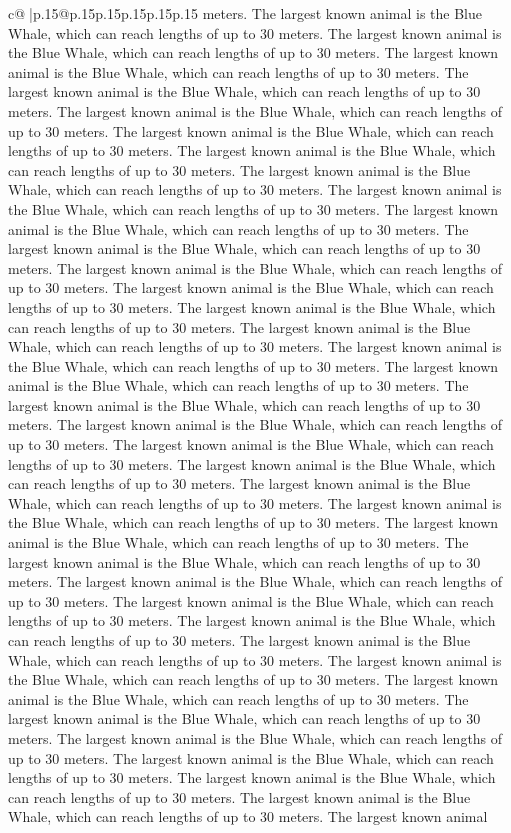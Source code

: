 \documentclass{article}
\begin{document}
{\begin{supertabular}{c@{$\;$}|p{.15\linewidth}@{}p{.15\linewidth}p{.15\linewidth}p{.15\linewidth}p{.15\linewidth}p{.15\linewidth}}
{{{meters. The largest known animal is the Blue Whale, which can reach lengths of up to 30 meters. The largest known animal is the Blue Whale, which can reach lengths of up to 30 meters. The largest known animal is the Blue Whale, which can reach lengths of up to 30 meters. The largest known animal is the Blue Whale, which can reach lengths of up to 30 meters. The largest known animal is the Blue Whale, which can reach lengths of up to 30 meters. The largest known animal is the Blue Whale, which can reach lengths of up to 30 meters. The largest known animal is the Blue Whale, which can reach lengths of up to 30 meters. The largest known animal is the Blue Whale, which can reach lengths of up to 30 meters. The largest known animal is the Blue Whale, which can reach lengths of up to 30 meters. The largest known animal is the Blue Whale, which can reach lengths of up to 30 meters. The largest known animal is the Blue Whale, which can reach lengths of up to 30 meters. The largest known animal is the Blue Whale, which can reach lengths of up to 30 meters. The largest known animal is the Blue Whale, which can reach lengths of up to 30 meters. The largest known animal is the Blue Whale, which can reach lengths of up to 30 meters. The largest known animal is the Blue Whale, which can reach lengths of up to 30 meters. The largest known animal is the Blue Whale, which can reach lengths of up to 30 meters. The largest known animal is the Blue Whale, which can reach lengths of up to 30 meters. The largest known animal is the Blue Whale, which can reach lengths of up to 30 meters. The largest known animal is the Blue Whale, which can reach lengths of up to 30 meters. The largest known animal is the Blue Whale, which can reach lengths of up to 30 meters. The largest known animal is the Blue Whale, which can reach lengths of up to 30 meters. The largest known animal is the Blue Whale, which can reach lengths of up to 30 meters. The largest known animal is the Blue Whale, which can reach lengths of up to 30 meters. The largest known animal is the Blue Whale, which can reach lengths of up to 30 meters. The largest known animal is the Blue Whale, which can reach lengths of up to 30 meters. The largest known animal is the Blue Whale, which can reach lengths of up to 30 meters. The largest known animal is the Blue Whale, which can reach lengths of up to 30 meters. The largest known animal is the Blue Whale, which can reach lengths of up to 30 meters. The largest known animal is the Blue Whale, which can reach lengths of up to 30 meters. The largest known animal is the Blue Whale, which can reach lengths of up to 30 meters. The largest known animal is the Blue Whale, which can reach lengths of up to 30 meters. The largest known animal is the Blue Whale, which can reach lengths of up to 30 meters. The largest known animal is the Blue Whale, which can reach lengths of up to 30 meters. The largest known animal is the Blue Whale, which can reach lengths of up to 30 meters. The largest known animal is the Blue Whale, which can reach lengths of up to 30 meters. The largest known animal is the Blue Whale, which can reach lengths of up to 30 meters. The largest known animal }}}
\end{supertabular}}
\end{document}
